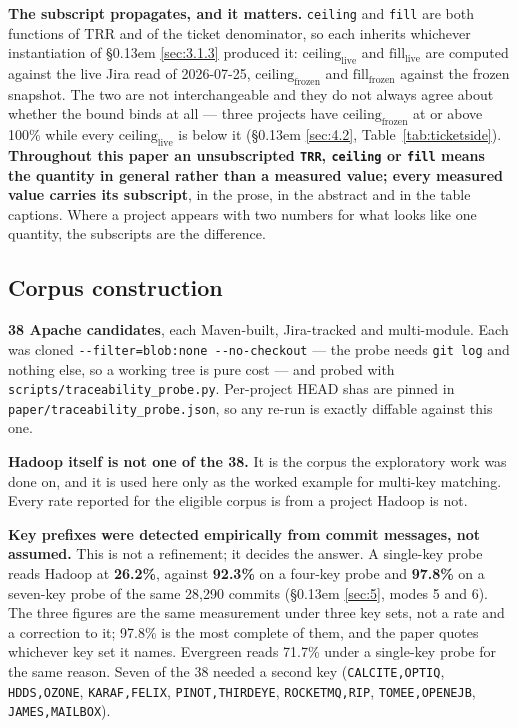 \documentclass[11pt,a4paper]{article}
\begin{document}
\textbf{The subscript propagates, and it matters.} \texttt{ceiling} and \texttt{fill} are both functions of TRR and of the ticket denominator, so each inherits whichever instantiation of \S\kern0.13em \ref{sec:3.1.3} produced it: $\mathrm{ceiling}_\mathrm{live}$ and $\mathrm{fill}_\mathrm{live}$ are computed against the live Jira read of 2026-07-25, $\mathrm{ceiling}_\mathrm{frozen}$ and $\mathrm{fill}_\mathrm{frozen}$ against the frozen snapshot. The two are not interchangeable and they do not always agree about whether the bound binds at all --- three projects have $\mathrm{ceiling}_\mathrm{frozen}$ at or above 100\% while every $\mathrm{ceiling}_\mathrm{live}$ is below it (\S\kern0.13em \ref{sec:4.2}, Table~\ref{tab:ticketside}). \textbf{Throughout this paper an unsubscripted \texttt{TRR}, \texttt{ceiling} or \texttt{fill} means the quantity in general rather than a measured value; every measured value carries its subscript}, in the prose, in the abstract and in the table captions. Where a project appears with two numbers for what looks like one quantity, the subscripts are the difference.

\subsection{Corpus construction}
\label{sec:3.2}

\textbf{38 Apache candidates}, each Maven-built, Jira-tracked and multi-module. Each was cloned \texttt{-\allowbreak{}-\allowbreak{}filter=blob:none -\allowbreak{}-\allowbreak{}no-\allowbreak{}checkout} --- the probe needs \texttt{git log} and nothing else, so a working tree is pure cost --- and probed with \texttt{scripts/\allowbreak{}traceability\_\allowbreak{}probe.\allowbreak{}py}. Per-project HEAD shas are pinned in \texttt{paper/\allowbreak{}traceability\_\allowbreak{}probe.\allowbreak{}json}, so any re-run is exactly diffable against this one.

\textbf{Hadoop itself is not one of the 38.} It is the corpus the exploratory work was done on, and it is used here only as the worked example for multi-key matching. Every rate reported for the eligible corpus is from a project Hadoop is not.

\textbf{Key prefixes were detected empirically from commit messages, not assumed.} This is not a refinement; it decides the answer. A single-key probe reads Hadoop at \textbf{26.2\%}, against \textbf{92.3\%} on a four-key probe and \textbf{97.8\%} on a seven-key probe of the same 28,290 commits (\S\kern0.13em \ref{sec:5}, modes 5 and 6). The three figures are the same measurement under three key sets, not a rate and a correction to it; 97.8\% is the most complete of them, and the paper quotes whichever key set it names. Evergreen reads 71.7\% under a single-key probe for the same reason. Seven of the 38 needed a second key (\texttt{CALCITE,OPTIQ}, \texttt{HDDS,OZONE}, \texttt{KARAF,FELIX}, \texttt{PINOT,THIRDEYE}, \texttt{ROCKETMQ,RIP}, \texttt{TOMEE,OPENEJB}, \texttt{JAMES,MAILBOX}).
\end{document}
